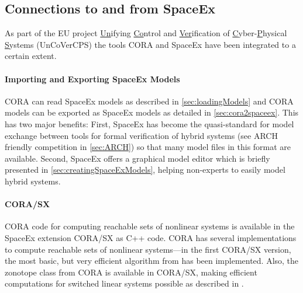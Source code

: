 \subsection{Connections to and from SpaceEx}

As part of the EU project \underline{Un}ifying \underline{Co}ntrol and \underline{Ver}ification of \underline{C}yber-\underline{P}hysical \underline{S}ystems (UnCoVerCPS) the tools CORA and SpaceEx\cite{Frehse2011} have been integrated to a certain extent.

\paragraph{Importing and Exporting SpaceEx Models} CORA can read SpaceEx models as described in \cref{sec:loadingModels} and CORA models can be exported as SpaceEx models as detailed in \cref{sec:cora2spaceex}. This has two major benefits: First, SpaceEx has become the quasi-standard for model exchange between tools for formal verification of hybrid systems (see ARCH friendly competition in \cref{sec:ARCH}) so that many model files in this format are available. Second, SpaceEx offers a graphical model editor which is briefly presented in \cref{sec:creatingSpaceExModels}, helping non-experts to easily model hybrid systems.

\paragraph{CORA/SX} CORA code for computing reachable sets of nonlinear systems is available in the SpaceEx extension CORA/SX as C++ code. CORA has several implementations to compute reachable sets of nonlinear systems---in the first CORA/SX version, the most basic, but very efficient algorithm from \cite{Althoff2008c} has been implemented. Also, the zonotope class from CORA is available in CORA/SX, making efficient computations for switched linear systems possible as described in \cite{Althoff2016c}. 